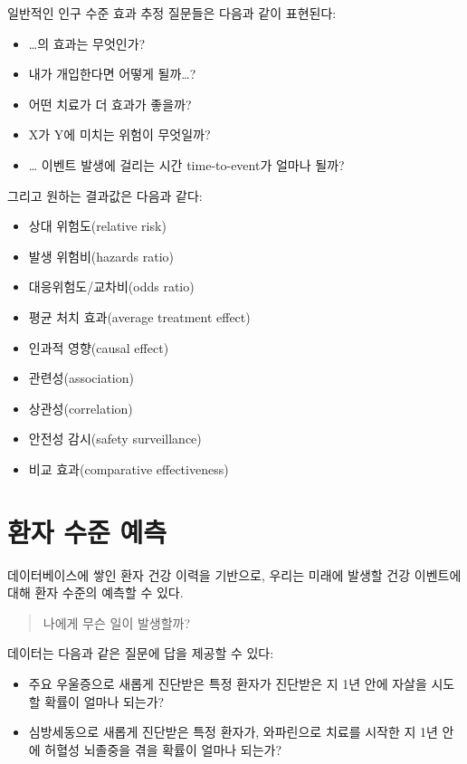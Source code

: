 \documentclass[11pt]{book}
\providecommand{\tightlist}{%
  \setlength{\itemsep}{0pt}\setlength{\parskip}{0pt}}
\theoremstyle{definition}
\theoremstyle{definition}
\theoremstyle{definition}
\theoremstyle{remark}
\begin{document}
일반적인 인구 수준 효과 추정 질문들은 다음과 같이 표현된다:

\begin{itemize}
\tightlist
\item
  \ldots{}의 효과는 무엇인가?
\item
  내가 개입한다면 어떻게 될까\ldots{}?
\item
  어떤 치료가 더 효과가 좋을까?
\item
  X가 Y에 미치는 위험이 무엇일까?
\item
  \ldots{} 이벤트 발생에 걸리는 시간 time-to-event가 얼마나 될까?
\end{itemize}

그리고 원하는 결과값은 다음과 같다:

\begin{itemize}
\tightlist
\item
  상대 위험도(relative risk)
\item
  발생 위험비(hazards ratio)
\item
  대응위험도/교차비(odds ratio)
\item
  평균 처치 효과(average treatment effect)
\item
  인과적 영향(causal effect)
\item
  관련성(association)
\item
  상관성(correlation)
\item
  안전성 감시(safety surveillance)
\item
  비교 효과(comparative effectiveness)
\end{itemize}

\section{환자 수준 예측}\label{--}


데이터베이스에 쌓인 환자 건강 이력을 기반으로, 우리는 미래에 발생할 건강
이벤트에 대해 환자 수준의 예측할 수 있다.

\begin{quote}
나에게 무슨 일이 발생할까?
\end{quote}

데이터는 다음과 같은 질문에 답을 제공할 수 있다:

\begin{itemize}
\tightlist
\item
  주요 우울증으로 새롭게 진단받은 특정 환자가 진단받은 지 1년 안에
  자살을 시도할 확률이 얼마나 되는가?
\item
  심방세동으로 새롭게 진단받은 특정 환자가, 와파린으로 치료를 시작한 지
  1년 안에 허혈성 뇌졸중을 겪을 확률이 얼마나 되는가?
\end{itemize}
\end{document}

